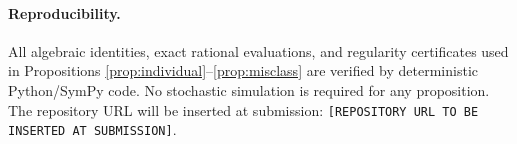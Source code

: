 \paragraph{Reproducibility.}
All algebraic identities, exact rational evaluations, and regularity certificates used in Propositions \ref{prop:individual}--\ref{prop:misclass} are verified by deterministic Python/SymPy code. No stochastic simulation is required for any proposition. The repository URL will be inserted at submission: \texttt{[REPOSITORY URL TO BE INSERTED AT SUBMISSION]}.
